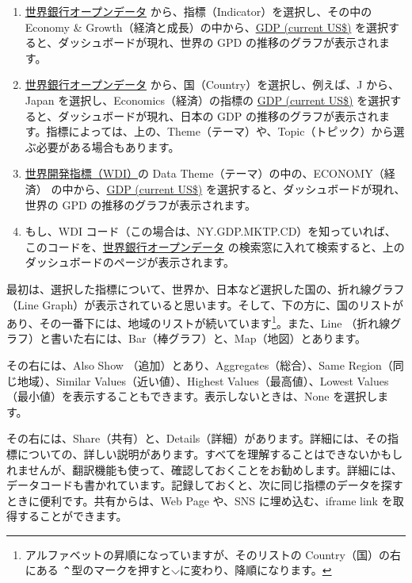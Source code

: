 \documentclass[
  xelatex, ja=standard]{bxjsbook}
\providecommand{\tightlist}{%
  \setlength{\itemsep}{0pt}\setlength{\parskip}{0pt}}
\theoremstyle{definition}
\theoremstyle{definition}
\theoremstyle{definition}
\theoremstyle{definition}
\theoremstyle{remark}
\begin{document}
\begin{enumerate}
\def\labelenumi{\arabic{enumi}.}
\tightlist
\item
  \href{https://data.worldbank.org}{世界銀行オープンデータ} から、指標（Indicator）を選択し、その中の Economy \& Growth（経済と成長）の中から、\href{https://data.worldbank.org/indicator/NY.GDP.MKTP.CD?view=chart}{GDP (current US\$)} を選択すると、ダッシュボードが現れ、世界の GPD の推移のグラフが表示されます。
\item
  \href{https://data.worldbank.org}{世界銀行オープンデータ} から、国（Country）を選択し、例えば、J から、Japan を選択し、Economics（経済）の指標の \protect\hyperlink{0}{GDP (current US\$)} を選択すると、ダッシュボードが現れ、日本の GDP の推移のグラフが表示されます。指標によっては、上の、Theme（テーマ）や、Topic（トピック）から選ぶ必要がある場合もあります。
\item
  \href{https://datatopics.worldbank.org/world-development-indicators/}{世界開発指標（WDI）}の Data Theme（テーマ）の中の、ECONOMY（経済） の中から、\href{https://data.worldbank.org/indicator/NY.GDP.MKTP.CD?view=chart}{GDP (current US\$)} を選択すると、ダッシュボードが現れ、世界の GPD の推移のグラフが表示されます。
\item
  もし、WDI コード（この場合は、NY.GDP.MKTP.CD）を知っていれば、このコードを、\href{https://data.worldbank.org}{世界銀行オープンデータ} の検索窓に入れて検索すると、上のダッシュボードのページが表示されます。
\end{enumerate}

最初は、選択した指標について、世界か、日本など選択した国の、折れ線グラフ（Line Graph）が表示されていると思います。そして、下の方に、国のリストがあり、その一番下には、地域のリストが続いています\footnote{アルファベットの昇順になっていますが、そのリストの Country（国）の右にある ⌃型のマークを押すと⌵に変わり、降順になります。}。また、Line （折れ線グラフ）と書いた右には、Bar（棒グラフ）と、Map（地図）とあります。

その右には、Also Show （追加）とあり、Aggregates（総合）、Same Region（同じ地域）、Similar Values（近い値）、Highest Values（最高値）、Lowest Values（最小値）を表示することもできます。表示しないときは、None を選択します。

その右には、Share（共有）と、Details（詳細）があります。詳細には、その指標についての、詳しい説明があります。すべてを理解することはできないかもしれませんが、翻訳機能も使って、確認しておくことをお勧めします。詳細には、データコードも書かれています。記録しておくと、次に同じ指標のデータを探すときに便利です。共有からは、Web Page や、SNS に埋め込む、iframe link を取得することができます。
\end{document}
